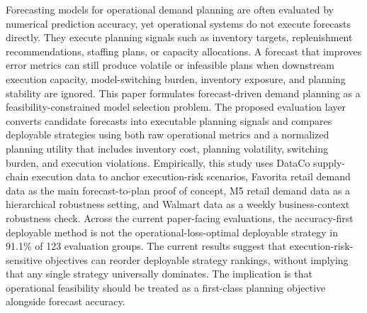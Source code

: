 Forecasting models for operational demand planning are often evaluated by numerical prediction accuracy, yet operational systems do not execute forecasts directly. They execute planning signals such as inventory targets, replenishment recommendations, staffing plans, or capacity allocations. A forecast that improves error metrics can still produce volatile or infeasible plans when downstream execution capacity, model-switching burden, inventory exposure, and planning stability are ignored. This paper formulates forecast-driven demand planning as a feasibility-constrained model selection problem. The proposed evaluation layer converts candidate forecasts into executable planning signals and compares deployable strategies using both raw operational metrics and a normalized planning utility that includes inventory cost, planning volatility, switching burden, and execution violations. Empirically, this study uses DataCo supply-chain execution data to anchor execution-risk scenarios, Favorita retail demand data as the main forecast-to-plan proof of concept, M5 retail demand data as a hierarchical robustness setting, and Walmart data as a weekly business-context robustness check. Across the current paper-facing evaluations, the accuracy-first deployable method is not the operational-loss-optimal deployable strategy in 91.1\% of 123 evaluation groups. The current results suggest that execution-risk-sensitive objectives can reorder deployable strategy rankings, without implying that any single strategy universally dominates. The implication is that operational feasibility should be treated as a first-class planning objective alongside forecast accuracy.
